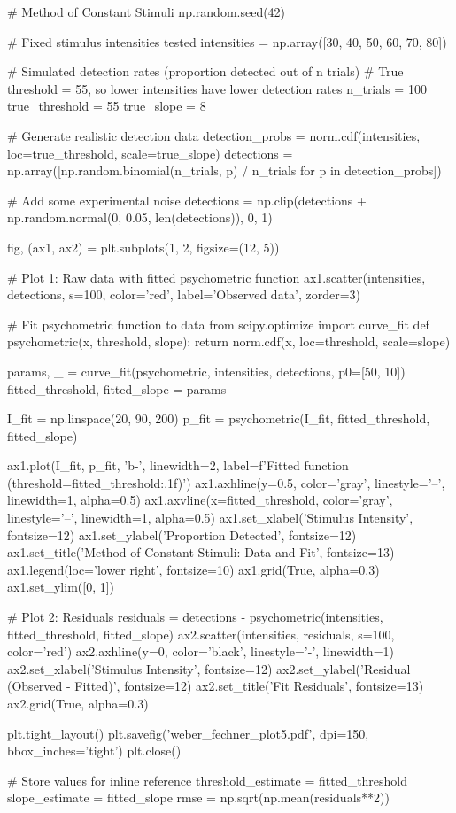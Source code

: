 \documentclass[11pt,a4paper]{article}
\begin{document}
\begin{pycode}
# Method of Constant Stimuli
np.random.seed(42)

# Fixed stimulus intensities tested
intensities = np.array([30, 40, 50, 60, 70, 80])

# Simulated detection rates (proportion detected out of n trials)
# True threshold = 55, so lower intensities have lower detection rates
n_trials = 100
true_threshold = 55
true_slope = 8

# Generate realistic detection data
detection_probs = norm.cdf(intensities, loc=true_threshold, scale=true_slope)
detections = np.array([np.random.binomial(n_trials, p) / n_trials for p in detection_probs])

# Add some experimental noise
detections = np.clip(detections + np.random.normal(0, 0.05, len(detections)), 0, 1)

fig, (ax1, ax2) = plt.subplots(1, 2, figsize=(12, 5))

# Plot 1: Raw data with fitted psychometric function
ax1.scatter(intensities, detections, s=100, color='red', label='Observed data', zorder=3)

# Fit psychometric function to data
from scipy.optimize import curve_fit
def psychometric(x, threshold, slope):
    return norm.cdf(x, loc=threshold, scale=slope)

params, _ = curve_fit(psychometric, intensities, detections, p0=[50, 10])
fitted_threshold, fitted_slope = params

I_fit = np.linspace(20, 90, 200)
p_fit = psychometric(I_fit, fitted_threshold, fitted_slope)

ax1.plot(I_fit, p_fit, 'b-', linewidth=2, label=f'Fitted function (threshold={fitted_threshold:.1f})')
ax1.axhline(y=0.5, color='gray', linestyle='--', linewidth=1, alpha=0.5)
ax1.axvline(x=fitted_threshold, color='gray', linestyle='--', linewidth=1, alpha=0.5)
ax1.set_xlabel('Stimulus Intensity', fontsize=12)
ax1.set_ylabel('Proportion Detected', fontsize=12)
ax1.set_title('Method of Constant Stimuli: Data and Fit', fontsize=13)
ax1.legend(loc='lower right', fontsize=10)
ax1.grid(True, alpha=0.3)
ax1.set_ylim([0, 1])

# Plot 2: Residuals
residuals = detections - psychometric(intensities, fitted_threshold, fitted_slope)
ax2.scatter(intensities, residuals, s=100, color='red')
ax2.axhline(y=0, color='black', linestyle='-', linewidth=1)
ax2.set_xlabel('Stimulus Intensity', fontsize=12)
ax2.set_ylabel('Residual (Observed - Fitted)', fontsize=12)
ax2.set_title('Fit Residuals', fontsize=13)
ax2.grid(True, alpha=0.3)

plt.tight_layout()
plt.savefig('weber_fechner_plot5.pdf', dpi=150, bbox_inches='tight')
plt.close()

# Store values for inline reference
threshold_estimate = fitted_threshold
slope_estimate = fitted_slope
rmse = np.sqrt(np.mean(residuals**2))
\end{pycode}
\end{document}
